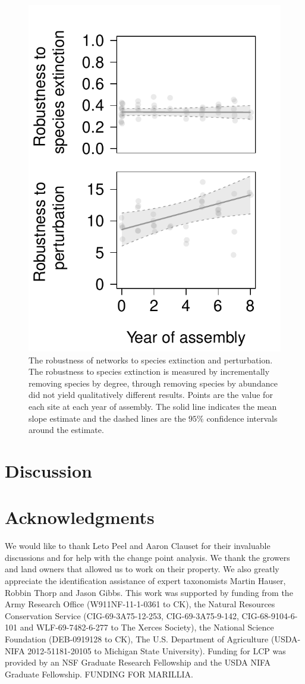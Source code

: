 \documentclass[12pt]{article}
\begin{document}
\begin{figure}
  \centering
  \includegraphics[width=.7\textwidth]{../analysis/networkLevel/figures/robustness.pdf}
  \caption{The robustness of networks to species extinction and
    perturbation. The robustness to species extinction is measured by
    incrementally removing species by degree, through removing
    species by abundance did not yield qualitatively different
    results. Points are the value for each site at each year of
    assembly. The solid line indicates the mean slope estimate and the
    dashed lines are the $95\%$ confidence intervals around the
    estimate.}
  \label{fig:rob}
\end{figure}
\clearpage


\section*{Discussion}
\label{sec:discussion}

\section*{Acknowledgments}
\label{sec:acknowledge}

We would like to thank Leto Peel and Aaron Clauset for their
invaluable discussions and for help with the change point analysis.
We thank the growers and land owners that allowed us to work on their
property.  We also greatly appreciate the identification assistance of
expert taxonomists Martin Hauser, Robbin Thorp and Jason Gibbs.  This
work was supported by funding from the Army Research Office
(W911NF-11-1-0361 to CK), the Natural Resources Conservation Service
(CIG-69-3A75-12-253, CIG-69-3A75-9-142, CIG-68-9104-6-101 and
WLF-69-7482-6-277 to The Xerces Society), the National Science
Foundation (DEB-0919128 to CK), The U.S.  Department of Agriculture
(USDA-NIFA 2012-51181-20105 to Michigan State University).  Funding
for LCP was provided by an NSF Graduate Research Fellowship and the
USDA NIFA Graduate Fellowship. FUNDING FOR MARILLIA.
\end{document}
